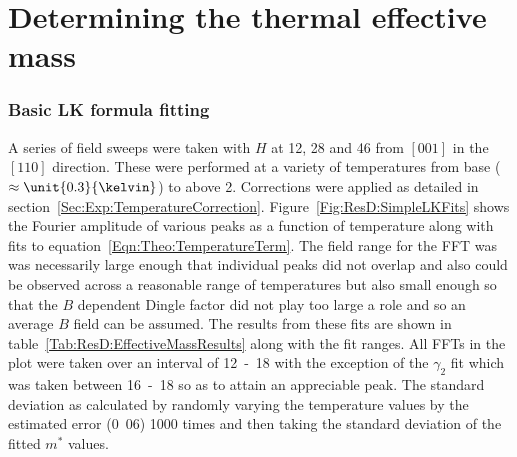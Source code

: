 
\section{Determining the thermal effective mass}


\subsubsection{Basic \ac{LK} formula fitting}

A series of field sweeps were taken with $H$ at \unit{12}{\degree}, \unit{28}{\degree} and \unit{46}{\degree} from $[001]$ in the $[110]$ direction. These were performed at a variety of temperatures from base ($\approx\unit{0.3}{\kelvin}$) to above \unit{2}{\kelvin}. Corrections were applied as detailed in section~\ref{Sec:Exp:TemperatureCorrection}. Figure~\ref{Fig:ResD:SimpleLKFits} shows the Fourier amplitude of various peaks as a function of temperature along with fits to equation~\ref{Eqn:Theo:TemperatureTerm}. The field range for the \ac{FFT} was was necessarily large enough that individual peaks did not overlap and also could be observed across a reasonable range of temperatures but also small enough so that the $B$ dependent Dingle factor did not play too large a role and so an average $B$ field can be assumed. The results from these fits are shown in table~\ref{Tab:ResD:EffectiveMassResults} along with the fit ranges. All \acp{FFT} in the plot were taken over an interval of \unit{12-18}{\tesla} with the exception of the $\gamma_2$ fit which was taken between \unit{16-18}{\tesla} so as to attain an appreciable peak. The standard deviation as calculated by randomly varying the temperature values by the estimated error (\unit{0.06}{\tesla}) 1000 times and then taking the standard deviation of the fitted $m^*$ values.
